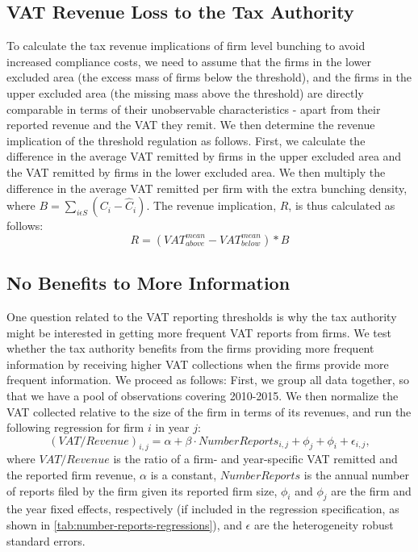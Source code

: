 \subsection{VAT Revenue Loss to the Tax Authority}
\label{subsec:3-methodology-revenue-loss}
To calculate the tax revenue implications of firm level bunching to avoid increased compliance costs, we need to assume that the firms in the lower excluded area (the excess mass of firms below the threshold), and the firms in the upper excluded area (the missing mass above the threshold) are directly comparable in terms of their unobservable characteristics - apart from their reported revenue and the VAT they remit. We then determine the revenue implication of the threshold regulation as follows. First, we calculate the difference in the average VAT remitted by firms in the upper excluded area and the VAT remitted by firms in the lower excluded area. We then multiply the difference in the average VAT remitted per firm with the extra bunching density, where $B=\sum_{i\epsilon S}(C_{i}-\hat{C}_{i})$. The revenue implication, $R$, is thus calculated as follows:
\begin{equation}
  \label{eq:revenue-implication}
  R=(VAT_{above}^{mean}-VAT_{below}^{mean})*B
\end{equation}

\subsection{No Benefits to More Information}
\label{subsec:3-methodology-more-information}
One question related to the VAT reporting thresholds is why the tax authority might be interested in getting more frequent VAT reports from firms. We test whether the tax authority benefits from the firms providing more frequent information by receiving higher VAT collections when the firms provide more frequent information. We proceed as follows: First, we group all data together, so that we have a pool of observations covering 2010-2015. We then normalize the VAT collected relative to the size of the firm in terms of its revenues, and run the following regression for firm $i$ in year $j$:
\begin{equation}
  (VAT/Revenue)_{i,j}=\alpha+\beta\cdot NumberReports_{i,j}+\phi_{j}+\phi_{i}+\epsilon_{i,j},
\end{equation}
where $VAT/Revenue$ is the ratio of a firm- and year-specific VAT remitted and the reported firm revenue, $\alpha$ is a constant, $NumberReports$ is the annual number of reports filed by the firm given its reported firm size, $\phi_{i}$ and $\phi_{j}$ are the firm and the year fixed effects, respectively (if included in the regression specification, as shown in \cref{tab:number-reports-regressions}), and $\epsilon$ are the heterogeneity robust standard errors.

